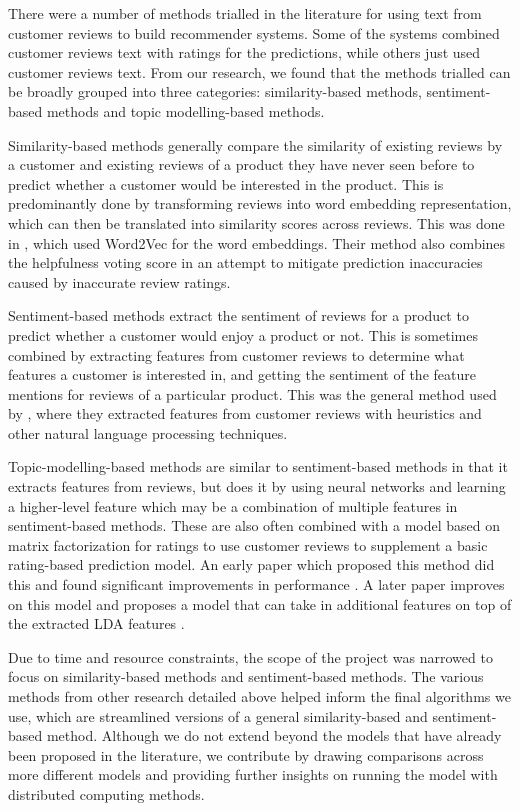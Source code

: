\documentclass[sigconf,authorversion,nonacm]{acmart}
\begin{document}
    There were a number of methods trialled in the literature for using text from customer reviews to build recommender systems. Some of the systems combined customer reviews text with ratings for the predictions, while others just used customer reviews text. From our research, we found that the methods trialled can be broadly grouped into three categories: similarity-based methods, sentiment-based methods and topic modelling-based methods. 

    Similarity-based methods generally compare the similarity of existing reviews by a customer and existing reviews of a product they have never seen before to predict whether a customer would be interested in the product. This is predominantly done by transforming reviews into word embedding representation, which can then be translated into similarity scores across reviews. This was done in \cite{hasanzadeh2022based}, which used Word2Vec for the word embeddings. Their method also combines the helpfulness voting score in an attempt to mitigate prediction inaccuracies caused by inaccurate review ratings. 

    Sentiment-based methods extract the sentiment of reviews for a product to predict whether a customer would enjoy a product or not. This is sometimes combined by extracting features from customer reviews to determine what features a customer is interested in, and getting the sentiment of the feature mentions for reviews of a particular product. This was the general method used by \cite{d2017exploiting}, where they extracted features from customer reviews with heuristics and other natural language processing techniques. 

    Topic-modelling-based methods are similar to sentiment-based methods in that it extracts features from reviews, but does it by using neural networks and learning a higher-level feature which may be a combination of multiple features in sentiment-based methods. These are also often combined with a model based on matrix factorization for ratings to use customer reviews to supplement a basic rating-based prediction model. An early paper which proposed this method did this and found significant improvements in performance \cite{mcauley2013hidden}. A later paper improves on this model and proposes a model that can take in additional features on top of the extracted LDA features \cite{aslanyan2021utilizing}.

    Due to time and resource constraints, the scope of the project was narrowed to focus on similarity-based methods and sentiment-based methods. The various methods from other research detailed above helped inform the final algorithms we use, which are streamlined versions of a general similarity-based and sentiment-based method. Although we do not extend beyond the models that have already been proposed in the literature, we contribute by drawing comparisons across more different models and providing further insights on running the model with distributed computing methods. 
\end{document}

